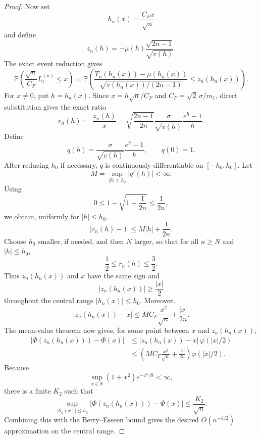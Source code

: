 \documentclass[11pt]{article}
\newcommand{\Prob}{\mathbb P}
\begin{document}
\begin{proof}
Now set
\begin{equation}
h_n(x)=\frac{C_Fx}{\sqrt n}
\end{equation}
and define
\begin{equation}
z_n(h)=-\mu(h)\frac{\sqrt{2n-1}}{\sqrt{v(h)}}.
\end{equation}
The exact event reduction gives
\begin{equation}
\Prob\!\left(\frac{\sqrt n}{C_F}L_t^{(n)}\le x\right)
=
\Prob\!\left(
\frac{T_n(h_n(x))-\mu(h_n(x))}{\sqrt{v(h_n(x))/(2n-1)}}
\le z_n(h_n(x))
\right).
\end{equation}
For $x\ne0$, put $h=h_n(x)$. Since $x=h\sqrt n/C_F$ and
$C_F=\sqrt2\,\sigma/m_1$, direct substitution gives the exact ratio
\begin{equation}
 r_n(h):=\frac{z_n(h)}{x}
 =\sqrt{\frac{2n-1}{2n}}
 \frac{\sigma}{\sqrt{v(h)}}
 \frac{e^h-1}{h}.
\end{equation}
Define
\begin{equation}
 q(h)=\frac{\sigma}{\sqrt{v(h)}}\frac{e^h-1}{h},
 \qquad q(0)=1.
\end{equation}
After reducing $h_0$ if necessary, $q$ is continuously differentiable on
$[-h_0,h_0]$. Let
\begin{equation}
 M=\sup_{|h|\le h_0}|q'(h)|<\infty.
\end{equation}
Using
\begin{equation}
0\le 1-\sqrt{1-\frac1{2n}}\le \frac1{2n},
\end{equation}
we obtain, uniformly for $|h|\le h_0$,
\begin{equation}
|r_n(h)-1|\le M|h|+\frac1{2n}.
\end{equation}
Choose $h_0$ smaller, if needed, and then $N$ larger, so that for all
$n\ge N$ and $|h|\le h_0$,
\begin{equation}
\frac12\le r_n(h)\le\frac32.
\end{equation}
Thus $z_n(h_n(x))$ and $x$ have the same sign and
\begin{equation}
|z_n(h_n(x))|\ge \frac{|x|}{2}
\end{equation}
throughout the central range $|h_n(x)|\le h_0$. Moreover,
\begin{equation}
|z_n(h_n(x))-x|
\le MC_F\frac{x^2}{\sqrt n}+\frac{|x|}{2n}.
\end{equation}
The mean-value theorem now gives, for some point between $x$ and
$z_n(h_n(x))$,
\begin{align}
|\Phi(z_n(h_n(x)))-\Phi(x)|
&\le |z_n(h_n(x))-x|\,\varphi(|x|/2)\\
&\le\left(MC_F\frac{x^2}{\sqrt n}+\frac{|x|}{2n}\right)
\varphi(|x|/2).
\end{align}
Because
\begin{equation}
\sup_{x\in\mathbb R}(1+x^2)e^{-x^2/8}<\infty,
\end{equation}
there is a finite $K_2$ such that
\begin{equation}
\sup_{|h_n(x)|\le h_0}
|\Phi(z_n(h_n(x)))-\Phi(x)|\le \frac{K_2}{\sqrt n}.
\end{equation}
Combining this with the Berry--Esseen bound gives the desired
$O(n^{-1/2})$ approximation on the central range.


\end{proof}
\end{document}
